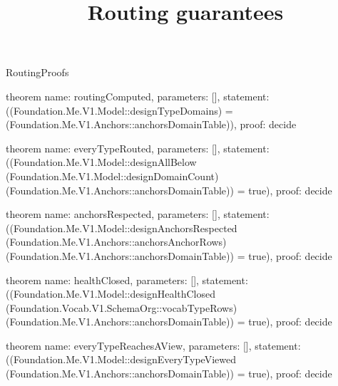\begin{lexlean}{RoutingProofs}
\title{Routing guarantees}
\begin{semanticmodule}
theorem{
  name: routingComputed,
  parameters: [],
  statement: ((Foundation.Me.V1.Model::designTypeDomains) = (Foundation.Me.V1.Anchors::anchorsDomainTable)),
  proof: decide{}
}

theorem{
  name: everyTypeRouted,
  parameters: [],
  statement: ((Foundation.Me.V1.Model::designAllBelow (Foundation.Me.V1.Model::designDomainCount) (Foundation.Me.V1.Anchors::anchorsDomainTable)) = true),
  proof: decide{}
}

theorem{
  name: anchorsRespected,
  parameters: [],
  statement: ((Foundation.Me.V1.Model::designAnchorsRespected (Foundation.Me.V1.Anchors::anchorsAnchorRows) (Foundation.Me.V1.Anchors::anchorsDomainTable)) = true),
  proof: decide{}
}

theorem{
  name: healthClosed,
  parameters: [],
  statement: ((Foundation.Me.V1.Model::designHealthClosed (Foundation.Vocab.V1.SchemaOrg::vocabTypeRows) (Foundation.Me.V1.Anchors::anchorsDomainTable)) = true),
  proof: decide{}
}

theorem{
  name: everyTypeReachesAView,
  parameters: [],
  statement: ((Foundation.Me.V1.Model::designEveryTypeViewed (Foundation.Me.V1.Anchors::anchorsDomainTable)) = true),
  proof: decide{}
}
\end{semanticmodule}
\end{lexlean}
